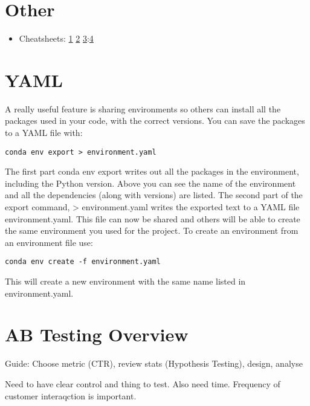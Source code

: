 \documentclass[]{book}
\providecommand{\tightlist}{%
  \setlength{\itemsep}{0pt}\setlength{\parskip}{0pt}}
\theoremstyle{definition}
\theoremstyle{definition}
\theoremstyle{definition}
\theoremstyle{remark}
\begin{document}
\section{Other}\label{other-1}

\begin{itemize}
\tightlist
\item
  Cheatsheets:
  \href{https://startupsventurecapital.com/essential-cheat-sheets-for-machine-learning-and-deep-learning-researchers-efb6a8ebd2e5}{1}
  \textbar{} \href{https://github.com/kailashahirwar/cheatsheets-ai}{2}
  \textbar{}
  \href{https://github.com/juliangaal/python-cheat-sheet}{3}:\href{http://www.datasciencefree.com/cheatsheets.html}{4}
\end{itemize}

\section{YAML}\label{yaml}

A really useful feature is sharing environments so others can install
all the packages used in your code, with the correct versions. You can
save the packages to a YAML file with:

\texttt{conda\ env\ export\ \textgreater{}\ environment.yaml}

The first part conda env export writes out all the packages in the
environment, including the Python version. Above you can see the name of
the environment and all the dependencies (along with versions) are
listed. The second part of the export command, \textgreater{}
environment.yaml writes the exported text to a YAML file
environment.yaml. This file can now be shared and others will be able to
create the same environment you used for the project. To create an
environment from an environment file use:

\texttt{conda\ env\ create\ -f\ environment.yaml}

This will create a new environment with the same name listed in
environment.yaml.

\section{AB Testing Overview}\label{ab-testing-overview}

Guide: Choose metric (CTR), review stats (Hypothesis Testing), design,
analyse

Need to have clear control and thing to test. Also need time. Frequency
of customer interaqction is important.
\end{document}
